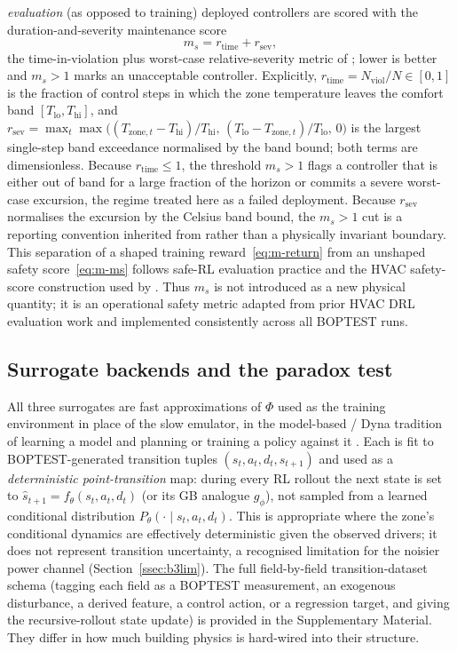 \emph{evaluation} (as opposed to training) deployed controllers are scored with the
duration-and-severity maintenance score
\begin{equation}
m_s = r_{\mathrm{time}} + r_{\mathrm{sev}},
\label{eq:m-ms}
\end{equation}
the time-in-violation plus worst-case relative-severity metric of \citet{Wang2025SafeDRL};
lower is better and $m_s>1$ marks an unacceptable controller. Explicitly,
$r_{\mathrm{time}}=N_{\mathrm{viol}}/N\in[0,1]$ is the fraction of control steps in which the
zone temperature leaves the comfort band $[T_{\mathrm{lo}},T_{\mathrm{hi}}]$, and
$r_{\mathrm{sev}}=\max_t\max\!\big((T_{\mathrm{zone},t}-T_{\mathrm{hi}})/T_{\mathrm{hi}},\,
(T_{\mathrm{lo}}-T_{\mathrm{zone},t})/T_{\mathrm{lo}},\,0\big)$ is the largest single-step band
exceedance normalised by the band bound; both terms are dimensionless. Because
$r_{\mathrm{time}}\le 1$, the threshold $m_s>1$ flags a controller that is either out of band for
a large fraction of the horizon or commits a severe worst-case excursion, the regime treated
here as a failed deployment. Because $r_{\mathrm{sev}}$ normalises the excursion by the Celsius band bound, the $m_s>1$ cut is a reporting convention inherited from \citet{Wang2025SafeDRL} rather than a physically invariant boundary. This separation of a
shaped training reward~\eqref{eq:m-return} from an unshaped safety score~\eqref{eq:m-ms}
follows safe-RL evaluation practice \citep{Garcia2015SafeRL} and the HVAC safety-score construction used by \citet{Wang2025SafeDRL}. Thus $m_s$ is not introduced as a new physical quantity; it is an operational safety metric adapted from prior HVAC DRL evaluation work and implemented consistently across all BOPTEST runs.

\subsection{Surrogate backends and the paradox test}\label{ssec:m-surrogate}
All three surrogates are fast approximations of $\Phi$ used as the training
environment in place of the slow emulator, in the model-based / Dyna tradition of
learning a model and planning or training a policy against it
\citep{Sutton1991Dyna,Hafner2025Dreamer}. Each is fit to BOPTEST-generated
transition tuples $(s_t,a_t,d_t,s_{t+1})$ and used as a \emph{deterministic
point-transition} map: during every RL rollout the next state is set to
$\hat s_{t+1}=f_\theta(s_t,a_t,d_t)$ (or its GB analogue $g_\phi$), not sampled from
a learned conditional distribution $P_\theta(\cdot\mid s_t,a_t,d_t)$. This is
appropriate where the zone's conditional dynamics are effectively deterministic
given the observed drivers; it does not represent transition uncertainty, a
recognised limitation for the noisier power channel (Section~\ref{ssec:b3lim}). The
full field-by-field transition-dataset schema (tagging each field as a BOPTEST
measurement, an exogenous disturbance, a derived feature, a control action, or a
regression target, and giving the recursive-rollout state update) is provided in
the Supplementary Material. They differ in how much building physics is hard-wired
into their structure.

